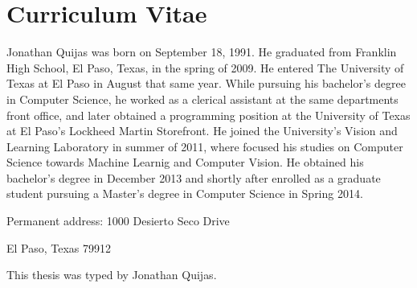 
\chapter*{Curriculum Vitae}
Jonathan Quijas was born on September 18, 1991. He graduated from Franklin High School, El Paso, Texas, in the spring
of 2009. He entered The University of Texas at El Paso in August that same year.
While pursuing his bachelor's degree in Computer Science, he worked as a clerical assistant
at the same departments front office, and later obtained a programming position at the
University of Texas at El Paso's Lockheed Martin Storefront. He joined the University's Vision and Learning Laboratory in summer
of 2011, where focused his studies on Computer Science towards Machine Learnig and Computer Vision.
He obtained his bachelor's degree in December 2013 and shortly after enrolled as a graduate student pursuing a Master's
degree in Computer Science in Spring 2014.

\medskip

\noindent
Permanent address: 1000 Desierto Seco Drive

\noindent
\hspace{1.42in}
El Paso, Texas 79912

\vfill
This thesis was typed by Jonathan Quijas.
